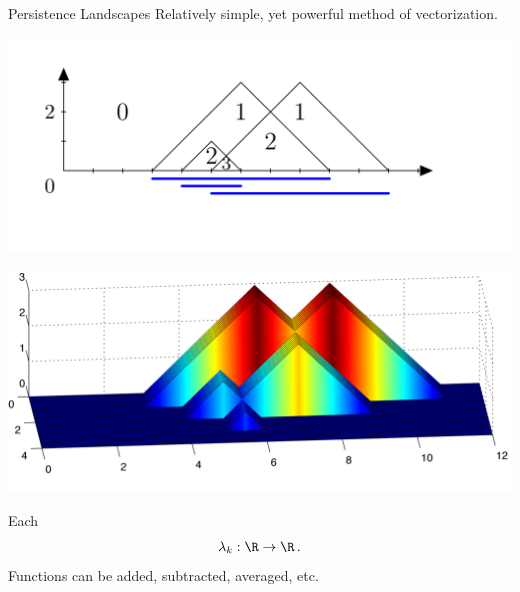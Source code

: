 \documentclass[usenames,dvipsnames,aspectratio=1610]{beamer}
\begin{document}
\begin{frame}{Persistence Landscapes}
  Relatively simple, yet powerful method of vectorization.
  \begin{minipage}{\textwidth}
    \begin{minipage}{0.7\textwidth}
      \begin{center}
	\includegraphics[scale=0.3]{images/l1.png}

	\includegraphics[scale=0.3]{images/l3.png}
      \end{center}
    \end{minipage}
    \begin{minipage}{0.25\textwidth}
      Each 
      \[
	\lambda_k: \R \to \R \, .
      \] 
      Functions can be added, subtracted, averaged, etc.

    \end{minipage}
  \end{minipage}
\end{frame}
\end{document}
